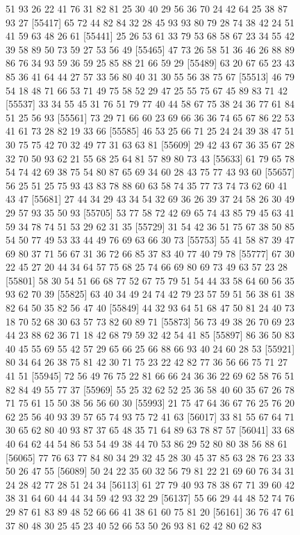 \documentclass{article}
\begin{document}
\begin{figure}[H]
\begin{Schunk}
\begin{Soutput}
[55393] 51 93 26 22 41 76 31 82 81 25 30 40 29 56 36 70 24 42 64 25 38 87 93 27
[55417] 65 72 44 82 84 32 28 45 93 93 80 79 28 74 38 42 24 51 41 59 63 48 26 61
[55441] 25 26 53 61 33 79 53 68 58 67 23 34 55 42 39 58 89 50 73 59 27 53 56 49
[55465] 47 73 26 58 51 36 46 26 88 89 86 76 34 93 59 36 59 25 85 88 21 66 59 29
[55489] 63 20 67 65 23 43 85 36 41 64 44 27 57 33 56 80 40 31 30 55 56 38 75 67
[55513] 46 79 54 18 48 71 66 53 71 49 75 58 52 29 47 25 55 75 67 45 89 83 71 42
[55537] 33 34 55 45 31 76 51 79 77 40 44 58 67 75 38 24 36 77 61 84 51 25 56 93
[55561] 73 29 71 66 60 23 69 66 36 36 74 65 67 86 22 53 41 61 73 28 82 19 33 66
[55585] 46 53 25 66 71 25 24 24 39 38 47 51 30 75 75 42 70 32 49 77 31 63 63 81
[55609] 29 42 43 67 36 35 67 28 32 70 50 93 62 21 55 68 25 64 81 57 89 80 73 43
[55633] 61 79 65 78 54 74 42 69 38 75 54 80 87 65 69 34 60 28 43 75 77 43 93 60
[55657] 56 25 51 25 75 93 43 83 78 88 60 63 58 74 35 77 73 74 73 62 60 41 43 47
[55681] 27 44 34 29 43 34 54 32 69 36 26 39 37 24 58 26 30 49 29 57 93 35 50 93
[55705] 53 77 58 72 42 69 65 74 43 85 79 45 63 41 59 34 78 74 51 53 29 62 31 35
[55729] 31 54 42 36 51 75 67 38 50 85 54 50 77 49 53 33 44 49 76 69 63 66 30 73
[55753] 55 41 58 87 39 47 69 80 37 71 56 67 31 36 72 66 85 37 83 40 77 40 79 78
[55777] 67 30 22 45 27 20 44 34 64 57 75 68 25 74 66 69 80 69 73 49 63 57 23 28
[55801] 58 30 54 51 66 68 77 52 67 75 79 51 54 44 33 58 64 60 56 35 93 62 70 39
[55825] 63 40 34 49 24 74 42 79 23 57 59 51 56 38 61 38 82 64 50 35 82 56 47 40
[55849] 44 32 93 64 51 68 47 50 81 24 40 73 18 70 52 68 30 63 57 73 82 60 89 71
[55873] 56 73 49 38 26 70 69 23 44 23 88 62 36 71 18 42 68 79 59 32 42 54 41 85
[55897] 86 36 50 83 40 45 55 69 55 42 57 29 65 66 25 66 88 66 93 40 24 60 28 53
[55921] 80 34 64 26 38 75 81 42 30 71 75 23 22 42 82 77 36 56 66 75 71 27 41 51
[55945] 72 56 49 76 75 22 81 66 66 24 36 36 22 69 62 58 76 51 82 84 49 55 77 37
[55969] 55 25 32 62 52 25 36 58 40 60 35 67 26 78 71 75 61 15 50 38 56 56 60 30
[55993] 21 75 47 64 36 67 76 25 76 20 62 25 56 40 93 39 57 65 74 93 75 72 41 63
[56017] 33 81 55 67 64 71 30 65 62 80 40 93 87 37 65 48 35 71 64 89 63 78 87 57
[56041] 33 68 40 64 62 44 54 86 53 54 49 38 44 70 53 86 29 52 80 80 38 56 88 61
[56065] 77 76 63 77 84 80 34 29 32 45 28 30 45 37 85 63 28 76 23 33 50 26 47 55
[56089] 50 24 22 35 60 32 56 79 81 22 21 69 60 76 34 31 24 28 42 77 28 51 24 34
[56113] 61 27 79 40 93 78 38 67 71 39 60 42 38 31 64 60 44 44 34 59 42 93 32 29
[56137] 55 66 29 44 48 52 74 76 29 87 61 83 89 48 52 66 66 41 38 61 60 75 81 20
[56161] 36 76 47 61 37 80 48 30 25 45 23 40 52 66 53 50 26 93 81 62 42 80 62 83

\end{Soutput}
\end{Schunk}
\end{figure}
\end{document}
